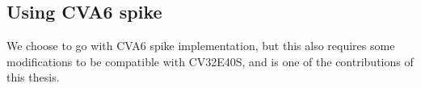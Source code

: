 %
%
%
%
%
%
%
%




%
%
%
%
%




\subsection{Using CVA6 spike}

We choose to go with CVA6 spike implementation, but this also requires some modifications to be compatible with CV32E40S, and is one of the contributions of this thesis.

